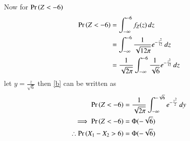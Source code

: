 \documentclass[journal,12pt,twocolumn]{IEEEtran}
\begin{document}
Now for $\Pr\left(Z<-6\right)$
\begin{align}
    \Pr\left(Z<-6\right)&=\int_{-\infty}^{-6}f_Z(z)\,dz\\
             &=\int_{-\infty}^{-6}\frac{1}{ \sqrt{12\pi}}e^{-\frac{{z}^2}{12}}\,dz\\
             &=\frac{1}{ \sqrt{2\pi}}\int_{-\infty}^{-6}\frac{1}{ \sqrt{6}}e^{-\frac{{z}^2}{12}}\,dz
             \label{b}
\end{align}
let $y=\frac{z}{\sqrt{6}}$ then \eqref{b} can be written as
\begin{align}
    \Pr\left(Z<-6\right)&=\frac{1}{ \sqrt{2\pi}}\int_{-\infty}^{-\sqrt{6}}e^{-\frac{{y}^2}{2}}\,dy\\
    \implies \Pr\left(Z<-6\right)&=\Phi(-\sqrt{6})\\
    \therefore \Pr\left(X_1-X_2>6\right)&=\Phi(-\sqrt{6})
\end{align}
\end{document}
